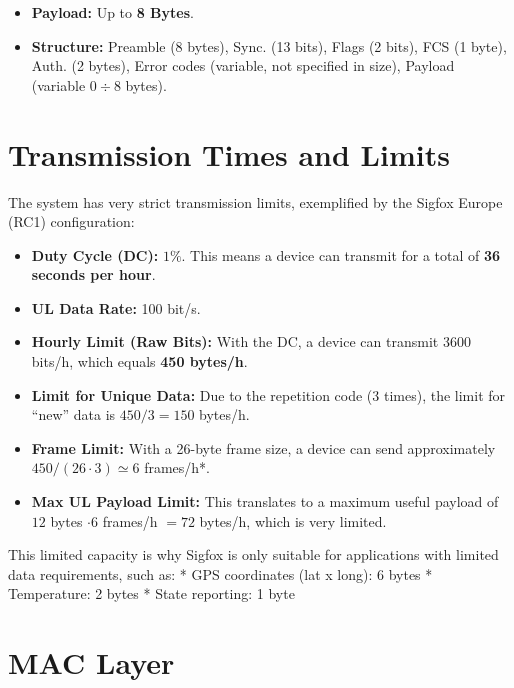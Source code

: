 \documentclass[a4paper, 12pt]{book} %
\begin{document}
\begin{itemize}
\tightlist
\item
  \textbf{Payload:} Up to \textbf{8 Bytes}.
\item
  \textbf{Structure:} Preamble (8 bytes), Sync. (13 bits), Flags (2
  bits), FCS (1 byte), Auth. (2 bytes), Error codes (variable, not
  specified in size), Payload (variable \(0\div8\) bytes).
\end{itemize}

\section{Transmission Times and
Limits}\label{transmission-times-and-limits}

The system has very strict transmission limits, exemplified by the
Sigfox Europe (RC1) configuration:

\begin{itemize}
\tightlist
\item
  \textbf{Duty Cycle (DC):} \(1\%\). This means a device can transmit
  for a total of \textbf{36 seconds per hour}.
\item
  \textbf{UL Data Rate:} 100 bit/s.
\item
  \textbf{Hourly Limit (Raw Bits):} With the DC, a device can transmit
  3600 bits/h, which equals \textbf{450 bytes/h}.
\item
  \textbf{Limit for Unique Data:} Due to the repetition code (3 times),
  the limit for ``new'' data is \(450/3 = 150\) bytes/h.
\item
  \textbf{Frame Limit:} With a 26-byte frame size, a device can send
  approximately \(450 / (26 \cdot 3) \simeq 6\) frames/h*.
\item
  \textbf{Max UL Payload Limit:} This translates to a maximum useful
  payload of \(12\) bytes \(\cdot 6\) frames/h \(= 72\) bytes/h, which
  is very limited.
\end{itemize}

This limited capacity is why Sigfox is only suitable for applications
with limited data requirements, such as: * GPS coordinates (lat x long):
6 bytes * Temperature: 2 bytes * State reporting: 1 byte

\section{MAC Layer}\label{mac-layer}
\end{document}
